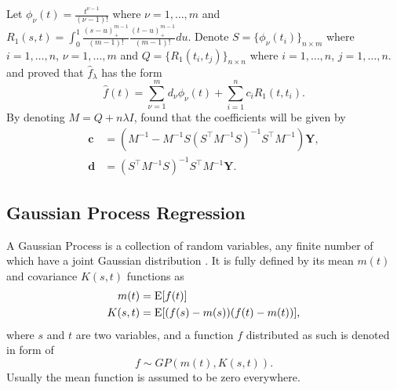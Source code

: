 Let $\phi_\nu (t)=\frac{t^{\nu-1}}{(\nu-1)!}$ where $\nu=1, \ldots, m$ and $R_1(s,t)=\int_0^1\frac{ (s-u)_+^{m-1}}{(m-1)!} \frac{ (t-u)_+^{m-1}}{(m-1)!} du$. Denote $S=\{\phi_\nu (t_i) \}_{n\times m}$ where $i=1, \ldots, n$, $\nu=1, \ldots, m$ and $Q=\{ R_1(t_i,t_j)\}_{n\times n}$ where $i=1, \ldots, n$, $j=1, \ldots, n$. \cite{kimeldorf1971some} and \cite{kimeldorf1970correspondence}  proved that $\hat{f}_\lambda$ has the form
\begin{equation}
\hat{f}(t)=\sum_{\nu=1}^m d_\nu \phi_\nu(t)+\sum_{i=1}^n c_iR_1(t,t_i).
\end{equation}
By denoting $M=Q+n\lambda I$, \cite{gu2013smoothing} found that the coefficients will be given by
\begin{align}
\mathbf{c}&=(M^{-1}-M^{-1}S(S^\top M^{-1}S)^{-1}S^\top M^{-1})\mathbf{Y},\\
\mathbf{d}&=(S^\top M^{-1}S)^{-1}S^\top M^{-1}\mathbf{Y}.
\end{align}





\subsection{Gaussian Process Regression}

A Gaussian Process is a collection of random variables, any finite number of which have a joint Gaussian distribution \cite{b_gpml}. It is fully defined by its mean $m(t)$ and covariance $K(s,t)$ functions as
\begin{align}
m(t)&=\mathrm{E} [f(t)] \\
K(s,t)&=\mathrm{E} \lbrack (f(s)-m(s)) (f(t)-m(t))\rbrack,
\end{align}
where $s$ and $t$ are two variables, and a function $f$ distributed as such is denoted in form of
\begin{equation}
f \sim GP(m(t),K(s,t)).
\end{equation}
Usually the mean function is assumed to be zero everywhere. 


